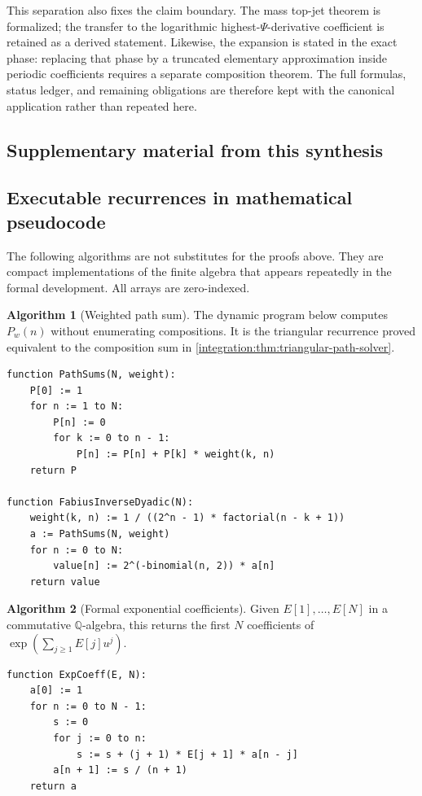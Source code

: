 \documentclass[11pt,oneside]{article}
\theoremstyle{definition}
\newtheorem{algorithm}[algorithm]{Algorithm}
\theoremstyle{remark}
\newcommand{\Q}{\mathbb Q}
\begin{document}
This separation also fixes the claim boundary.  The mass top-jet theorem is formalized;
the transfer to the logarithmic highest-\(\Psi\)-derivative coefficient is retained as a
derived statement.  Likewise, the expansion is stated in the exact phase: replacing that
phase by a truncated elementary approximation inside periodic coefficients requires a
separate composition theorem.  The full formulas, status ledger, and remaining obligations
are therefore kept with the canonical application rather than repeated here.

\clearpage
\subsection*{Supplementary material from this synthesis}
\subsection{Executable recurrences in mathematical pseudocode}
\label{integration:app:algorithms}

The following algorithms are not substitutes for the proofs above.  They are compact
implementations of the finite algebra that appears repeatedly in the formal development.
All arrays are zero-indexed.

\begin{algorithm}[Weighted path sum]
\label{integration:alg:path-sum}
The dynamic program below computes $P_w(n)$ without enumerating compositions.  It is the
triangular recurrence proved equivalent to the composition sum in
\cref{integration:thm:triangular-path-solver}.
\end{algorithm}
\begin{lstlisting}[style=pseudo]
function PathSums(N, weight):
    P[0] := 1
    for n := 1 to N:
        P[n] := 0
        for k := 0 to n - 1:
            P[n] := P[n] + P[k] * weight(k, n)
    return P

function FabiusInverseDyadic(N):
    weight(k, n) := 1 / ((2^n - 1) * factorial(n - k + 1))
    a := PathSums(N, weight)
    for n := 0 to N:
        value[n] := 2^(-binomial(n, 2)) * a[n]
    return value
\end{lstlisting}

\begin{algorithm}[Formal exponential coefficients]
\label{integration:alg:expcoeff}
Given $E[1],\ldots,E[N]$ in a commutative $\Q$-algebra, this returns the first $N$
coefficients of $\exp(\sum_{j\ge1}E[j]u^j)$.
\end{algorithm}
\begin{lstlisting}[style=pseudo]
function ExpCoeff(E, N):
    a[0] := 1
    for n := 0 to N - 1:
        s := 0
        for j := 0 to n:
            s := s + (j + 1) * E[j + 1] * a[n - j]
        a[n + 1] := s / (n + 1)
    return a
\end{lstlisting}
\end{document}

